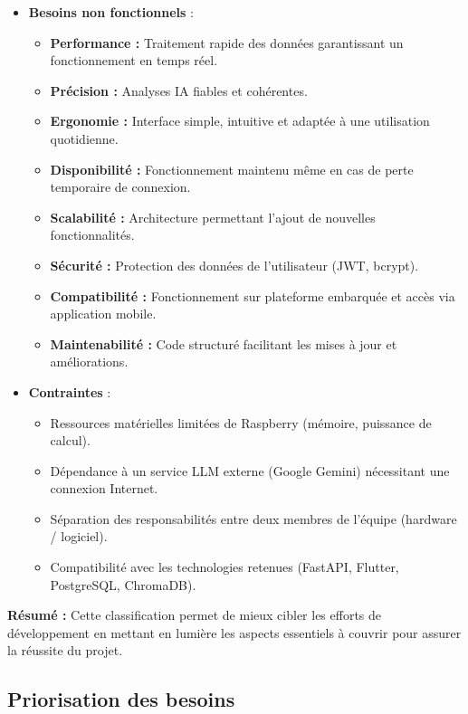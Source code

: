 \begin{itemize}
    \item \textbf{Besoins non fonctionnels} :
    \begin{itemize}
        \item \textbf{Performance :} Traitement rapide des données garantissant un fonctionnement en temps réel.
        \item \textbf{Précision :} Analyses IA fiables et cohérentes.
        \item \textbf{Ergonomie :} Interface simple, intuitive et adaptée à une utilisation quotidienne.
        \item \textbf{Disponibilité :} Fonctionnement maintenu même en cas de perte temporaire de connexion.
        \item \textbf{Scalabilité :} Architecture permettant l'ajout de nouvelles fonctionnalités.
        \item \textbf{Sécurité :} Protection des données de l'utilisateur (\ac{JWT}, bcrypt).
        \item \textbf{Compatibilité :} Fonctionnement sur plateforme embarquée et accès via application mobile.
        \item \textbf{Maintenabilité :} Code structuré facilitant les mises à jour et améliorations.
    \end{itemize}

    \item \textbf{Contraintes} :
    \begin{itemize}
        \item Ressources matérielles limitées de Raspberry (mémoire, puissance de calcul).
        \item Dépendance à un service \ac{LLM} externe (Google Gemini) nécessitant une connexion Internet.
        \item Séparation des responsabilités entre deux membres de l'équipe (hardware / logiciel).
        \item Compatibilité avec les technologies retenues (FastAPI, Flutter, PostgreSQL, ChromaDB).
    \end{itemize}
\end{itemize}
\vspace{1em}

\noindent\colorbox{gray!15}{%
    \parbox{\dimexpr\linewidth-2\fboxsep}{%
        \small
        \textbf{Résumé :} Cette classification permet de mieux cibler les efforts de développement en mettant en lumière les aspects essentiels à couvrir pour assurer la réussite du projet.
    }%
}

\subsection{Priorisation des besoins}

